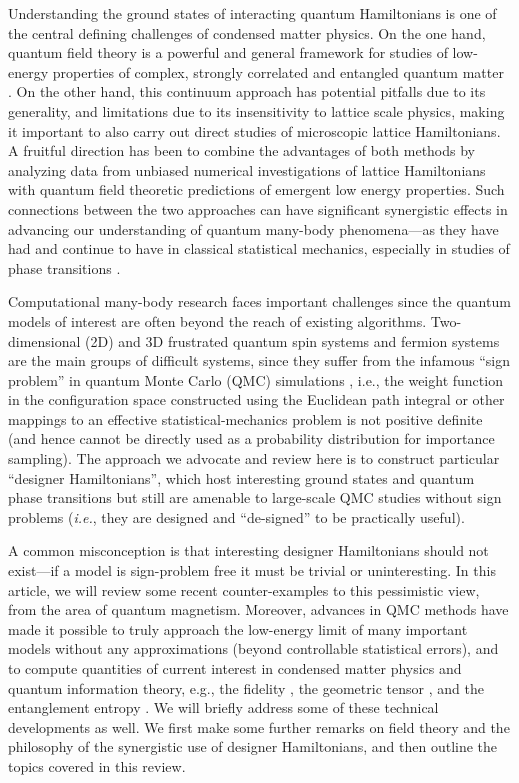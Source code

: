 \documentclass[range]{ar2e}
\begin{document}
Understanding the ground states of interacting quantum Hamiltonians is one of the central defining challenges of condensed matter physics. On the one
hand, quantum field theory is a powerful and general framework for studies of low-energy properties of complex, strongly correlated and entangled 
quantum matter \cite{Sachdev11}. On the other hand, this continuum approach has potential pitfalls due to its generality, and limitations due to its 
insensitivity to lattice scale physics, making it important to also carry out direct studies of microscopic lattice Hamiltonians. A fruitful direction 
has been to combine the advantages of both methods by analyzing data from unbiased numerical investigations of lattice Hamiltonians with quantum field 
theoretic predictions of emergent low energy properties. Such connections between the two approaches can have significant synergistic effects in advancing 
our understanding of quantum many-body phenomena---as they have had and continue to have in classical statistical mechanics, especially in studies 
of phase transitions \cite{Chaikin00}. 

Computational many-body research faces important challenges since the quantum models of interest are often beyond the reach 
of existing algorithms. Two-dimensional (2D) and 3D frustrated quantum spin systems and fermion systems are the main groups 
of difficult systems, since they suffer from the infamous ``sign problem'' in quantum Monte Carlo (QMC) simulations
\cite{Loh90,Henelius00,Nyfeler08}, i.e., the weight function in the configuration space constructed using the Euclidean path 
integral or other mappings to an effective statistical-mechanics problem is not positive definite (and hence cannot be directly 
used as a probability distribution for importance sampling). The approach we advocate and review here is to construct particular 
``designer Hamiltonians'', which host interesting ground states and quantum phase transitions but still are amenable to 
large-scale QMC studies without sign problems ({\em i.e.}, they are designed and ``de-signed'' to be practically useful). 


A common misconception is that interesting designer Hamiltonians should not exist---if a model is sign-problem 
free it must be trivial or uninteresting. 
In this article, we will review some recent counter-examples to this pessimistic view, 
from the area of quantum magnetism. 
Moreover, advances in QMC 
methods \cite{Sandvik91,Evertz93,Beard96,WormA,Sandvik99,Sandvik10a} have made it possible to truly approach the 
low-energy limit of many important models without any approximations (beyond controllable statistical errors), and to compute 
quantities of current interest in condensed matter physics and quantum information theory, e.g., the fidelity 
\cite{Schwandt09}, the geometric tensor \cite{Degrandi11}, and the entanglement entropy \cite{Hastings10, Melko10}. We will 
briefly address some of these technical developments as well. We first make some further remarks on field theory and the philosophy 
of the synergistic use of designer Hamiltonians, and then outline the topics covered in this review.
\end{document}
